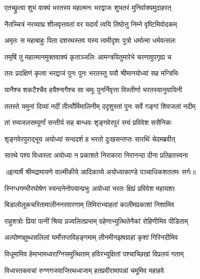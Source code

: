 \twolineshloka
{एतच्छ्रुत्वा शुभं वाक्यं भरतस्य महात्मनः}
{भरद्वाजः शुभतरं मुनिर्वाक्यमुदाहरत्} %

\twolineshloka
{नैतच्चित्रं नरव्याघ्र शीलवृत्तवतां वर}
{यदार्यं त्वयि तिष्ठेत्तु निम्ने वृष्टिमिवोदकम्} %

\twolineshloka
{अमृतः स महाबाहुः पिता दशरथस्तव}
{यस्य त्वमीदृशः पुत्रो धर्मात्मा धर्मवत्सलः} %

\twolineshloka
{तमृषिं तु महात्मानमुक्तवाक्यं कृताञ्जलिः}
{आमन्त्रयितुमारेभे चरणावुपगृह्य च} %

\twolineshloka
{ततः प्रदक्षिणं कृत्वा भरद्वाजं पुनः पुनः}
{भरतस्तु ययौ श्रीमानयोध्यां सह मन्त्रिभिः} %

\twolineshloka
{यानैश्च शकटैश्चैव हयैश्नागैश्च सा चमूः}
{पुनर्निवृत्ता विस्तीर्णा भरतस्यानुयायिनी} %

\twolineshloka
{ततस्ते यमुनां दिव्यां नदीं तीर्त्वोर्मिमालिनीम्}
{ददृशुस्तां पुनः सर्वे गङ्गां शिवजलां नदीम्} %

\twolineshloka
{तां रम्यजलसम्पूर्णां सन्तीर्य सह बान्धवः}
{शृङ्गवेरपुरं रम्यं प्रविवेश ससैनिकः} %

\twolineshloka
{शृङ्गवेरपुराद्भूय अयोध्यां सन्ददर्श ह}
{भरतो दुःखसन्तप्तः सारथिं चेदमब्रवीत्} %

\twolineshloka
{सारथे पश्य विध्वस्ता अयोध्या न प्रकाशते}
{निराकारा निरानन्दा दीना प्रतिहतस्वना} %


{॥इत्यार्षे श्रीमद्रामायणे वाल्मीकीये आदिकाव्ये अयोध्याकाण्डे पञ्चाधिकशततमः सर्गः॥}


\twolineshloka
{स्निग्धगम्भीरघोषेण स्यन्दनेनोपयान्प्रभुः}
{अयोध्यां भरतः क्षिप्रं प्रविवेश महायशाः} %

\twolineshloka
{बिडालोलूकचरितामालीननरवारणाम्}
{तिमिराभ्याहतां कालीमप्रकाशां निशामिव} %

\twolineshloka
{राहुशत्रोः प्रियां पत्नीं श्रिया प्रज्वलितप्रभाम्}
{ग्रहेणाभ्युत्थितेनैकां रोहिणीमिव पीडिताम्} %

\twolineshloka
{अल्पोष्णक्षुब्धसलिलां घर्मोत्तप्तविहङ्गमाम्}
{लीनमीनझषग्राहां कृशां गिरिनदीमिव} %

\twolineshloka
{विधूमामिव हेमाभामध्वराग्निसमुत्थिताम्}
{हविरभ्युक्षितां पश्चाच्छिखां विप्रलयं गताम्} %

\twolineshloka
{विध्वस्तकवचां रुग्णगजवाजिरथध्वजाम्}
{हतप्रवीरामापन्नां चमूमिव महाहवे} %


